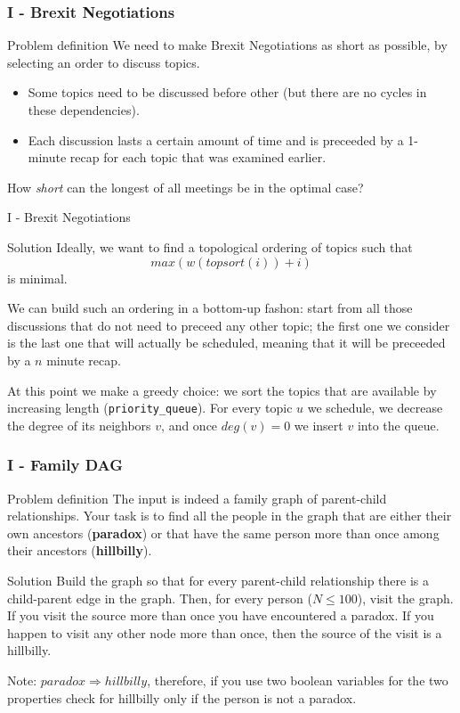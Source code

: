 \documentclass{beamer}
\begin{document}
\begin{frame}
  \frametitle{I - Brexit Negotiations}
  \begin{block}{Problem definition}
    We need to make Brexit Negotiations as short as possible, by selecting an order to discuss topics.
    \begin{itemize}
      \item Some topics need to be discussed before other (but there are no cycles in these dependencies).
      \item Each discussion lasts a certain amount of time and is preceeded by a 1-minute recap 
            for each topic that was examined earlier.
    \end{itemize}
    How \textit{short} can the longest of all meetings be in the optimal case?
  \end{block}
\end{frame}
\begin{frame}{I - Brexit Negotiations}
  \begin{block}{Solution}
    Ideally, we want to find a topological ordering of topics such that $$max(w(topsort(i))+i)$$ is minimal.
    
    We can build such an ordering in a bottom-up fashon: start from all those discussions that do not need to preceed any other topic;
    the first one we consider is the last one that will actually be scheduled, meaning that it will be preceeded by a $n$ minute recap.
    
    At this point we make a \alert{greedy choice}: we sort the topics that are available by increasing length (\texttt{priority\_queue}).
    For every topic $u$ we schedule, we decrease the degree of its neighbors $v$, and once $deg(v)=0$ we insert $v$ into the queue. 
  \end{block}
\end{frame}

\begin{frame}
  \frametitle{I - Family DAG}
  \begin{block}{Problem definition}
    The input is indeed a family graph of parent-child relationships. Your task is to find all the people in 
    the graph that are either their own ancestors (\textbf{paradox}) or that have the same person more than once
    among their ancestors (\textbf{hillbilly}).
  \end{block}
  \pause
  \begin{block}{Solution}
    Build the graph so that for every parent-child relationship there is a child-parent edge in the graph.
    Then, for every person ($N\leq 100$), visit the graph. If you visit the source more than once you have encountered a paradox.
    If you happen to visit any other node more than once, then the source of the visit is a hillbilly.
  \end{block}
  \alert{Note:} $paradox \Rightarrow hillbilly$, therefore, if you use two boolean variables for the two properties
  check for hillbilly only if the person is not a paradox.
\end{frame}
\end{document}
